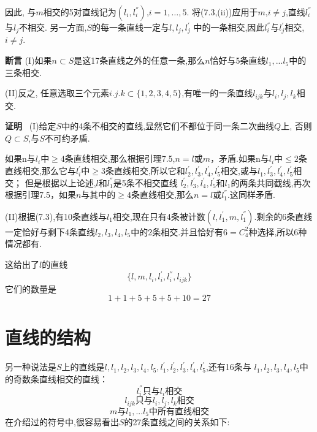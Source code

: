 \documentclass[UTF8]{book}
\begin{document}
	因此, 与$ m $相交的5对直线记为$(l_{i},l^{''}_{i})$,$ i = 1,…,5. $ 将(7.3,(ii))应用于$ m $,$i \neq j$,直线$l^{''}_{i}$与$l_{j}$不相交. 另一方面,$ S $的每一条直线一定与$l, l_{j},l^{'}_{j}$ 中的一条相交,因此$l^{''}_{i}$与$l^{'}_{j}$相交,$i\neq j$.
	
	\textbf{断言}
	(I)如果$n\subset S$是这17条直线之外的任意一条,那么$ n $恰好与5条直线$l_{1},...l_{5}$中的三条相交.
	
	(II)反之, 任意选取三个元素${i.j.k}\subset\{1,2,3,4,5\}$,有唯一的一条直线$l_{ijk}$与$l_{i},l_{j},l_{k}$相交.
	
	
	\textbf{证明} \ (I)给定$ S $中的4条不相交的直线,显然它们不都位于同一条二次曲线$ Q $上, 否则$Q\subset S$,与$ S $不可约矛盾.
	
	如果n与$l_{i}$中$\geq 4$条直线相交,那么根据引理7.5,$n=l$或$ m $，矛盾.如果n与$l_{i}$中$\leq 2$条直线相交,那么它与$l^{'}_{i}$中$\geq 3$条直线相交,所以它和$l^{'}_{2},l^{'}_{3},l^{'}_{4},l^{'}_{5}$相交,或与$l_{1},l^{'}_{3},l^{'}_{4},l^{'}_{5}$相交；
	但是根据以上论述,$l$和$l^{''}_{1}$是5条不相交直线 $l^{'}_{2},l^{'}_{3},l^{'}_{4},l^{'}_{5}$和$l_{1}$的两条共同截线,再次根据引理7.5，如果$ n $与其中的$\geq 4$条直线相交,那么$n=l$或$l^{''}_{1}$.这同样矛盾.
	
	(II)根据(7.3),有10条直线与$l_{1}$相交,现在只有4条被计数$(l,l^{'}_{1},m,l^{''}_{1})$.剩余的6条直线一定恰好与剩下4条直线$l_{2} ,l_{3} , l_{4} , l_{5}$中的2条相交.并且恰好有$6=C^{2}_{4}$种选择,所以6种情况都有.
	
	这给出了$l$的直线
	\begin{equation*}
	\{l,m,l_{i},l^{'}_{i},l^{''}_{i},l_{ijk}\}
	\end{equation*}
	它们的数量是
	\begin{equation*}
	1+1+5+5+5+10=27
	\end{equation*}
	\section{直线的结构}
	另一种说法是$ S $上的直线是$l,l_{1},l_{2},l_{3},l_{4},l_{5},l^{'}_{1},l^{'}_{2},l^{'}_{3},l^{'}_{4},l^{'}_{5}$,还有16条与
	$l_{1},l_{2},l_{3},l_{4},l_{5}$中的奇数条直线相交的直线：
	\begin{equation*}
	l^{''}_{i} \text{只与} l_{i}\text{相交}
	\end{equation*}
	\begin{equation*}
	l_{ijk} \text{只与}l_{i},l_{j},l_{k}\text{相交}
	\end{equation*}
	\begin{equation*}
	m\text{与}l_{1},...l_{5}\text{中所有直线相交}
	\end{equation*}
	在介绍过的符号中,很容易看出$ S $的27条直线之间的关系如下:
	
\end{document}
